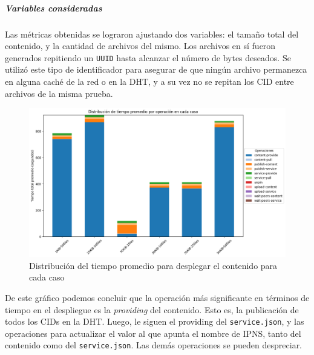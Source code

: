 \subparagraph{Variables consideradas} Las métricas obtenidas se lograron ajustando dos variables: el tamaño total del contenido, y la cantidad de archivos del mismo. Los archivos en sí fueron generados repitiendo un \texttt{UUID} hasta alcanzar el número de bytes deseados. Se utilizó este tipo de identificador para asegurar de que ningún archivo permanezca en alguna caché de la red o en la DHT, y a su vez no se repitan los CID entre archivos de la misma prueba.

\begin{figure}[H]
    \centering
    \includegraphics[width=1\linewidth]{img/metricas-ipfs/metricas-ipfs-caso1-1.png}
    \caption{Distribución del tiempo promedio para desplegar el contenido para cada caso}
    \label{fig:metricas-ipfs-caso1-1.png}
\end{figure}

De este gráfico podemos concluir que la operación más significante en términos de tiempo en el despliegue es la \textit{providing} del contenido. Esto es, la publicación de todos los CIDs en la DHT. Luego, le siguen el providing del \texttt{service.json}, y las operaciones para actualizar el valor al que apunta el nombre de IPNS, tanto del contenido como del \texttt{service.json}. Las demás operaciones se pueden despreciar.



